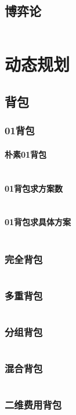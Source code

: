 \documentclass[a4paper,12pt]{article}
\begin{document}
\subsection{博弈论}
\inputminted[breaklines, linenos]{c++}{math/game.cc}

\newpage
\section{动态规划}
\subsection{背包}
\subsubsection{01背包}
\paragraph{朴素01背包}
\inputminted[breaklines, linenos]{c++}{dp/bag/01.cc}
\paragraph{01背包求方案数}
\inputminted[breaklines, linenos]{c++}{dp/bag/sum.cc}
\paragraph{01背包求具体方案}
\inputminted[breaklines, linenos]{c++}{dp/bag/01_way.cc}
\subsubsection{完全背包}
\inputminted[breaklines, linenos]{c++}{dp/bag/comp.cc}
\subsubsection{多重背包}
\inputminted[breaklines, linenos]{c++}{dp/bag/mul.cc}
\subsubsection{分组背包}
\inputminted[breaklines, linenos]{c++}{dp/bag/group.cc}
\subsubsection{混合背包}
\inputminted[breaklines, linenos]{c++}{dp/bag/mix.cc}
\subsubsection{二维费用背包}
\inputminted[breaklines, linenos]{c++}{dp/bag/2di.cc}
\end{document}
